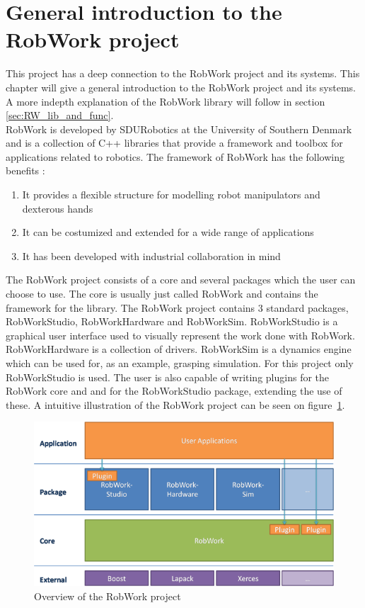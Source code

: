\section{General introduction to the RobWork project}
This project has a deep connection to the RobWork project and its systems. This chapter will give a general introduction to the RobWork project and its systems. A more indepth explanation of the RobWork library will follow in section \ref{sec:RW_lib_and_func}.\\

RobWork is developed by SDURobotics at the University of Southern Denmark and is a collection of C++ libraries \cite{RW_Webpage} that provide a framework and toolbox for applications related to robotics. The framework of RobWork has the following benefits \cite{RW_Toolbox_Framework}:

\begin{enumerate}
	\item It provides a flexible structure for modelling robot manipulators and dexterous hands
	\item It can be costumized and extended for a wide range of applications
	\item It has been developed with industrial collaboration in mind
\end{enumerate}

The RobWork project consists of a core and several packages which the user can choose to use. The core is usually just called RobWork and contains the framework for the library. The RobWork project contains 3 standard packages, RobWorkStudio, RobWorkHardware and RobWorkSim. RobWorkStudio is a graphical user interface used to visually represent the work done with RobWork. RobWorkHardware is a collection of drivers. RobWorkSim is a dynamics engine which can be used for, as an example, grasping simulation. For this project only RobWorkStudio is used. The user is also capable of writing plugins for the RobWork core and and for the RobWorkStudio package, extending the use of these. A intuitive illustration of the RobWork project can be seen on figure~\ref{fig:RWOverview}.

\begin{figure}[h]
	\centering
	\includegraphics[scale=1]{Figures/RWOverview.png}
	\caption{Overview of the RobWork project \cite{RW_Overview}}
	\label{fig:RWOverview}
\end{figure}